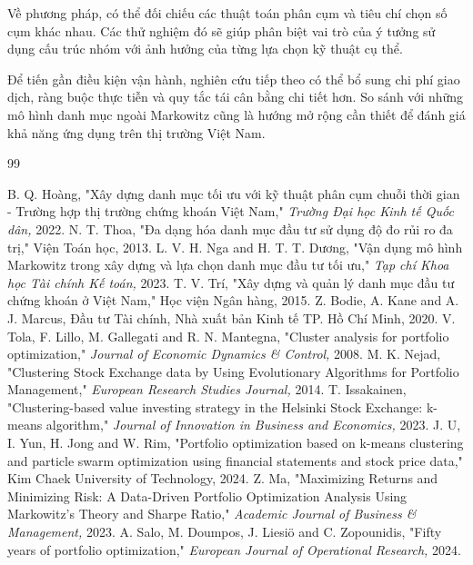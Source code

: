 \documentclass[12pt,a4paper,openany,oneside]{book}
\begin{document}
Về phương pháp, có thể đối chiếu các thuật toán phân cụm và tiêu chí chọn số cụm khác nhau. Các thử nghiệm đó sẽ giúp phân biệt vai trò của ý tưởng sử dụng cấu trúc nhóm với ảnh hưởng của từng lựa chọn kỹ thuật cụ thể.

Để tiến gần điều kiện vận hành, nghiên cứu tiếp theo có thể bổ sung chi phí giao dịch, ràng buộc thực tiễn và quy tắc tái cân bằng chi tiết hơn. So sánh với những mô hình danh mục ngoài Markowitz cũng là hướng mở rộng cần thiết để đánh giá khả năng ứng dụng trên thị trường Việt Nam.

\begin{thebibliography}{99}
{}
 B. Q. Hoàng, "Xây dựng danh mục tối ưu với kỹ thuật phân cụm chuỗi thời gian - Trường hợp thị trường chứng khoán Việt Nam," \textit{Trường Đại học Kinh tế Quốc dân, }2022.
 N. T. Thoa, "Đa dạng hóa danh mục đầu tư sử dụng độ đo rủi ro đa trị," Viện Toán học, 2013.
 L. V. H. Nga and H. T. T. Dương, "Vận dụng mô hình Markowitz trong xây dựng và lựa chọn danh mục đầu tư tối ưu," \textit{Tạp chí Khoa học Tài chính Kế toán, }2023.
 T. V. Trí, "Xây dựng và quản lý danh mục đầu tư chứng khoán ở Việt Nam," Học viện Ngân hàng, 2015.
 Z. Bodie, A. Kane and A. J. Marcus, Đầu tư Tài chính, Nhà xuất bản Kinh tế TP. Hồ Chí Minh, 2020.
 V. Tola, F. Lillo, M. Gallegati and R. N. Mantegna, "Cluster analysis for portfolio optimization," \textit{Journal of Economic Dynamics \& Control, }2008.
 M. K. Nejad, "Clustering Stock Exchange data by Using Evolutionary Algorithms for Portfolio Management," \textit{European Research Studies Journal, }2014.
 T. Issakainen, "Clustering-based value investing strategy in the Helsinki Stock Exchange: k-means algorithm," \textit{Journal of Innovation in Business and Economics, }2023.
 J. U, I. Yun, H. Jong and W. Rim, "Portfolio optimization based on k-means clustering and particle swarm optimization using financial statements and stock price data," Kim Chaek University of Technology, 2024.
 Z. Ma, "Maximizing Returns and Minimizing Risk: A Data-Driven Portfolio Optimization Analysis Using Markowitz's Theory and Sharpe Ratio," \textit{Academic Journal of Business \& Management, }2023.
 A. Salo, M. Doumpos, J. Liesiö and C. Zopounidis, "Fifty years of portfolio optimization," \textit{European Journal of Operational Research, }2024.
\end{thebibliography}
\end{document}
